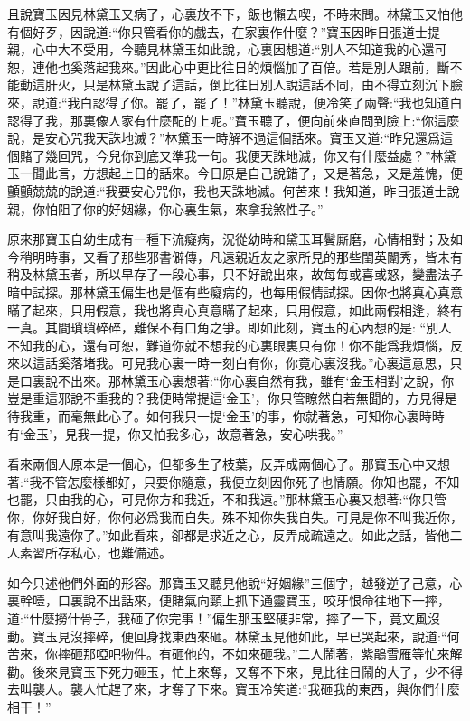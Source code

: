 \begin{parag}
    且說寶玉因見林黛玉又病了，心裏放不下，飯也懶去喫，不時來問。林黛玉又怕他有個好歹，因說道:“你只管看你的戲去，在家裏作什麼？”寶玉因昨日張道士提親，心中大不受用，今聽見林黛玉如此說，心裏因想道:“別人不知道我的心還可恕，連他也奚落起我來。”因此心中更比往日的煩惱加了百倍。若是別人跟前，斷不能動這肝火，只是林黛玉說了這話，倒比往日別人說這話不同，由不得立刻沉下臉來，說道:“我白認得了你。罷了，罷了！”林黛玉聽說，便冷笑了兩聲:“我也知道白認得了我，那裏像人家有什麼配的上呢。”寶玉聽了，便向前來直問到臉上:“你這麼說，是安心咒我天誅地滅？”林黛玉一時解不過這個話來。寶玉又道:“昨兒還爲這個賭了幾回咒，今兒你到底又準我一句。我便天誅地滅，你又有什麼益處？”林黛玉一聞此言，方想起上日的話來。今日原是自己說錯了，又是著急，又是羞愧，便顫顫兢兢的說道:“我要安心咒你，我也天誅地滅。何苦來！我知道，昨日張道士說親，你怕阻了你的好姻緣，你心裏生氣，來拿我煞性子。”
\end{parag}


\begin{parag}
    原來那寶玉自幼生成有一種下流癡病，況從幼時和黛玉耳鬢廝磨，心情相對；及如今稍明時事，又看了那些邪書僻傳，凡遠親近友之家所見的那些閨英闈秀，皆未有稍及林黛玉者，所以早存了一段心事，只不好說出來，故每每或喜或怒，變盡法子暗中試探。那林黛玉偏生也是個有些癡病的，也每用假情試探。因你也將真心真意瞞了起來，只用假意，我也將真心真意瞞了起來，只用假意，如此兩假相逢，終有一真。其間瑣瑣碎碎，難保不有口角之爭。即如此刻，寶玉的心內想的是: “別人不知我的心，還有可恕，難道你就不想我的心裏眼裏只有你！你不能爲我煩惱，反來以這話奚落堵我。可見我心裏一時一刻白有你，你竟心裏沒我。”心裏這意思，只是口裏說不出來。那林黛玉心裏想著:“你心裏自然有我，雖有‘金玉相對’之說，你豈是重這邪說不重我的？我便時常提這‘金玉’，你只管瞭然自若無聞的，方見得是待我重，而毫無此心了。如何我只一提‘金玉’的事，你就著急，可知你心裏時時有‘金玉’，見我一提，你又怕我多心，故意著急，安心哄我。”
\end{parag}


\begin{parag}
    看來兩個人原本是一個心，但都多生了枝葉，反弄成兩個心了。那寶玉心中又想著:“我不管怎麼樣都好，只要你隨意，我便立刻因你死了也情願。你知也罷，不知也罷，只由我的心，可見你方和我近，不和我遠。”那林黛玉心裏又想著:“你只管你，你好我自好，你何必爲我而自失。殊不知你失我自失。可見是你不叫我近你，有意叫我遠你了。”如此看來，卻都是求近之心，反弄成疏遠之。如此之話，皆他二人素習所存私心，也難備述。
\end{parag}


\begin{parag}
    如今只述他們外面的形容。那寶玉又聽見他說“好姻緣”三個字，越發逆了己意，心裏幹噎，口裏說不出話來，便賭氣向頸上抓下通靈寶玉，咬牙恨命往地下一摔，道:“什麼撈什骨子，我砸了你完事！”偏生那玉堅硬非常，摔了一下，竟文風沒動。寶玉見沒摔碎，便回身找東西來砸。林黛玉見他如此，早已哭起來，說道:“何苦來，你摔砸那啞吧物件。有砸他的，不如來砸我。”二人鬧著，紫鵑雪雁等忙來解勸。後來見寶玉下死力砸玉，忙上來奪，又奪不下來，見比往日鬧的大了，少不得去叫襲人。襲人忙趕了來，才奪了下來。寶玉冷笑道:“我砸我的東西，與你們什麼相干！”
\end{parag}


